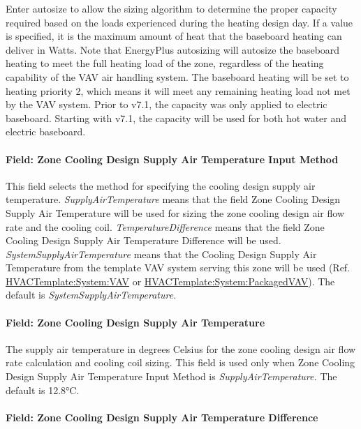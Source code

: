 Enter autosize to allow the sizing algorithm to determine the proper capacity required based on the loads experienced during the heating design day. If a value is specified, it is the maximum amount of heat that the baseboard heating can deliver in Watts. Note that EnergyPlus autosizing will autosize the baseboard heating to meet the full heating load of the zone, regardless of the heating capability of the VAV air handling system. The baseboard heating will be set to heating priority 2, which means it will meet any remaining heating load not met by the VAV system. Prior to v7.1, the capacity was only applied to electric baseboard. Starting with v7.1, the capacity will be used for both hot water and electric baseboard.

\paragraph{Field: Zone Cooling Design Supply Air Temperature Input Method}\label{field-zone-cooling-design-supply-air-temperature-input-method-7}

This field selects the method for specifying the cooling design supply air temperature. \emph{SupplyAirTemperature} means that the field Zone Cooling Design Supply Air Temperature will be used for sizing the zone cooling design air flow rate and the cooling coil. \emph{TemperatureDifference} means that the field Zone Cooling Design Supply Air Temperature Difference will be used. \emph{SystemSupplyAirTemperature} means that the Cooling Design Supply Air Temperature from the template VAV system serving this zone will be used (Ref. \hyperref[hvactemplatesystemvav]{HVACTemplate:System:VAV} or \hyperref[hvactemplatesystempackagedvav]{HVACTemplate:System:PackagedVAV}). The default is \emph{SystemSupplyAirTemperature.}

\paragraph{Field: Zone Cooling Design Supply Air Temperature}\label{field-zone-cooling-design-supply-air-temperature-6}

The supply air temperature in degrees Celsius for the zone cooling design air flow rate calculation and cooling coil sizing. This field is used only when Zone Cooling Design Supply Air Temperature Input Method is \emph{SupplyAirTemperature.} The default is 12.8°C.

\paragraph{Field: Zone Cooling Design Supply Air Temperature Difference}\label{field-zone-cooling-design-supply-air-temperature-difference-7}

